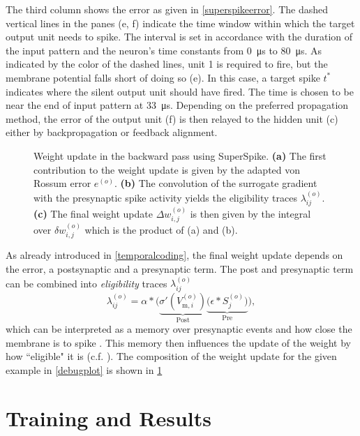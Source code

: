 The third column shows the error as given in \cref{superspikeerror}. The dashed vertical lines in the panes (e, f) indicate the time window within which the target output unit needs to spike. The interval is set in accordance with the duration of the input pattern and the neuron's time constants from \SI{0}{\micro \s} to \SI{80}{\micro \s}. As indicated by the color of the dashed lines, unit 1 is required to fire, but the membrane potential falls short of doing so (e). In this case, a target spike $t^*$ indicates where the silent output unit should have fired. The time is chosen to be near the end of input pattern at \SI{33}{\micro \s}. Depending on the preferred propagation method, the error of the output unit (f) is then relayed to the hidden unit (c) either by backpropagation or feedback alignment.

\begin{figure}
	\centering
	
	\caption[Weight update in the backward pass using SuperSpike.]{Weight update in the backward pass using SuperSpike. \textbf{(a)} The first contribution to the weight update is given by the adapted von Rossum error $e^{(o)}$. \textbf{(b)} The convolution of the surrogate gradient with the presynaptic spike activity yields the eligibility traces $\lambda_{ij}^{(o)}$. \textbf{(c)} The final weight update $\Delta w_{i,j}^{(o)}$ is then given by the integral over $\delta w_{i,j}^{(o)}$ which is the product of (a) and (b).}
	\label{weightchangesplot}
\end{figure}

As already introduced in \cref{temporalcoding}, the final weight update depends on the error, a postsynaptic and a presynaptic term. The post and presynaptic term can be combined into \emph{eligibility} traces $\lambda_{ij}^{(o)}$
\begin{equation*}
\lambda_{ij}^{(o)} = \alpha \ast 
\Big(\underbrace{\sigma'(V^{(o)}_{\text{m},i})}_{\text{Post}} 
\underbrace{\big(\epsilon \ast S_j^{(o)}\big)}_{\text{Pre}}\Big),
\end{equation*}
which can be interpreted as a memory over presynaptic events and how close the membrane is to spike . This memory then influences the update of the weight by how ``eligible" it is (c.f. \citealp{sutton2011reinforcement}). The composition of the weight update for the given example in \cref{debugplot} is shown in \cref{weightchangesplot}

\section{Training and Results}

